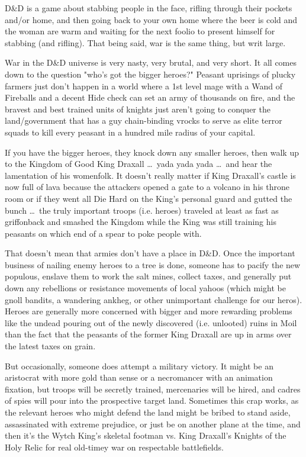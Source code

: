 D\&D is a game about stabbing people in the face, rifling through their pockets and/or home, and then going back to your own home where the beer is cold and the woman are warm and waiting for the next foolio to present himself for stabbing (and rifling). That being said, war is the same thing, but writ large.

War in the D\&D universe is very nasty, very brutal, and very short. It all comes down to the question "who's got the bigger heroes?" Peasant uprisings of plucky farmers just don't happen in a world where a 1st level mage with a Wand of Fireballs and a decent Hide check can set an army of thousands on fire, and the bravest and best trained units of knights just aren't going to conquer the land/government that has a guy chain-binding vrocks to serve as elite terror squads to kill every peasant in a hundred mile radius of your capital.

If you have the bigger heroes, they knock down any smaller heroes, then walk up to the Kingdom of Good King Draxall  \ldots\  yada yada yada \ldots\ and hear the lamentation of his womenfolk. It doesn't really matter if King Draxall's castle is now full of lava because the attackers opened a gate to a volcano in his throne room or if they went all Die Hard on the King's personal guard and gutted the bunch \ldots\ the truly important troops (i.e. heroes) traveled at least as fast as griffonback and smashed the Kingdom while the King was still training his peasants on which end of a spear to poke people with.

That doesn't mean that armies don't have a place in D\&D. Once the important business of nailing enemy heroes to a tree is done, someone has to pacify the new populous, enslave them to work the salt mines, collect taxes, and generally put down any rebellions or resistance movements of local yahoos (which might be gnoll bandits, a wandering ankheg, or other unimportant challenge for our heros). Heroes are generally more concerned with bigger and more rewarding problems like the undead pouring out of the newly discovered (i.e. unlooted) ruins in Moil than the fact that the peasants of the former King Draxall are up in arms over the latest taxes on grain.

But occasionally, someone does attempt a military victory. It might be an aristocrat with more gold than sense or a necromancer with an animation fixation, but troops will be secretly trained, mercenaries will be hired, and cadres of spies will pour into the prospective target land. Sometimes this crap works, as the relevant heroes who might defend the land might be bribed to stand aside, assassinated with extreme prejudice, or just be on another plane at the time, and then it's the Wytch King's skeletal footman vs. King Draxall's Knights of the Holy Relic for real old-timey war on respectable battlefields.

